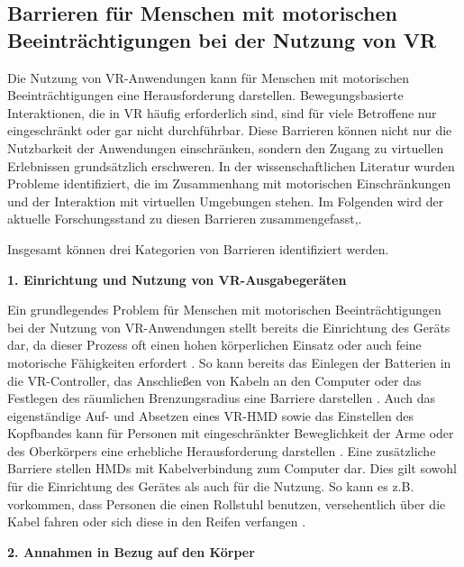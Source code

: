\subsection{Barrieren für Menschen mit motorischen Beeinträchtigungen bei der Nutzung von VR}

Die Nutzung von VR-Anwendungen kann für Menschen mit motorischen Beeinträchtigungen eine Herausforderung darstellen. Bewegungsbasierte Interaktionen, die in VR häufig erforderlich sind, sind für viele Betroffene nur eingeschränkt oder gar nicht durchführbar. Diese Barrieren können nicht nur die Nutzbarkeit der Anwendungen einschränken, sondern den Zugang zu virtuellen Erlebnissen grundsätzlich erschweren. In der wissenschaftlichen Literatur wurden Probleme identifiziert, die im Zusammenhang mit motorischen Einschränkungen und der Interaktion mit virtuellen Umgebungen stehen. Im Folgenden wird der aktuelle Forschungsstand zu diesen Barrieren zusammengefasst,. 

Insgesamt können drei Kategorien von Barrieren identifiziert werden.

{\normalfont \bfseries 1. Einrichtung und Nutzung von VR-Ausgabegeräten}  

Ein grundlegendes Problem für Menschen mit motorischen Beeinträchtigungen bei der Nutzung von VR-Anwendungen stellt bereits die Einrichtung des Geräts dar, da dieser Prozess oft einen hohen körperlichen Einsatz oder auch feine motorische Fähigkeiten erfordert \citep{gerling_critical_2021}. So kann bereits das Einlegen der Batterien in die VR-Controller, das Anschließen von Kabeln an den Computer oder das Festlegen des räumlichen Brenzungsradius eine Barriere darstellen \citep{mott_i_2020}. Auch das eigenständige Auf- und Absetzen eines VR-HMD sowie das Einstellen des Kopfbandes kann für Personen mit eingeschränkter Beweglichkeit der Arme oder des Oberkörpers eine erhebliche Herausforderung darstellen \citep{mott_i_2020}. Eine zusätzliche Barriere stellen HMDs mit Kabelverbindung zum Computer dar. Dies gilt sowohl für die Einrichtung des Gerätes als auch für die Nutzung. So kann es z.B. vorkommen, dass Personen die einen Rollstuhl benutzen, versehentlich über die Kabel fahren oder sich diese in den Reifen verfangen \citep{mott_i_2020, wong_survey_2017}. 

{\normalfont \bfseries 2. Annahmen in Bezug auf den Körper} 
 
